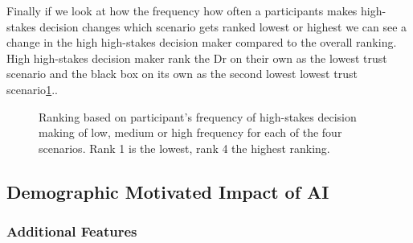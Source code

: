 \documentclass[manuscript,screen,review]{acmart}
\begin{document}
Finally if we look at how the frequency how often a participants makes high-stakes decision changes which scenario gets ranked lowest or highest we can see a change in the high high-stakes decision maker compared to the overall ranking. High high-stakes decision maker rank the Dr on their own as the lowest trust scenario and the black box on its own as the second lowest lowest trust scenario\ref{fig:ranking-highstakes-decision}..

\begin{figure}[H]
    \caption{Ranking based on participant's frequency of high-stakes decision making of low, medium or high frequency for each of the four scenarios. Rank 1 is the lowest, rank 4 the highest ranking.}
    \label{fig:ranking-highstakes-decision}
\end{figure}














\subsection{Demographic Motivated Impact of AI}


\subsubsection{Additional Features}
\end{document}
